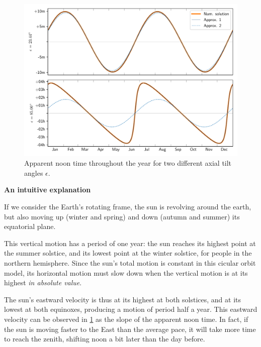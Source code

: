 \documentclass[12pt]{article}
\begin{document}
\begin{figure}[ht]
    \centering
    \includegraphics[width=\textwidth]{./noon_computed_easy.pdf}
    \caption{
        Apparent noon time throughout the year for two different axial tilt angles $\epsilon$.
    }
    \label{fig:noon_shift}
\end{figure}

\textbf{An intuitive explanation}

If we consider the Earth's rotating frame,
the sun is revolving around the earth, but also moving up 
(winter and spring) and down (autumn and summer) its equatorial plane.

This vertical motion has a period of one year: the sun reaches its highest point
at the summer solstice, and its lowest point at the winter solstice, for people 
in the northern hemisphere. Since the sun's total motion is constant in this 
cicular orbit model, its horizontal motion must slow down when the vertical 
motion is at its highest \textit{in absolute value}. 

The sun's eastward velocity is thus at its highest
at both solstices, and at its lowest at both equinoxes, producing a
motion of period half a year. This eastward velocity can be observed in 
\ref{fig:noon_shift} as the slope of the apparent noon time. In fact, 
if the sun is moving faster to the East than the average pace, it will take 
more time to reach the zenith, shifting noon a bit later than the day before.


\clearpage
\end{document}
